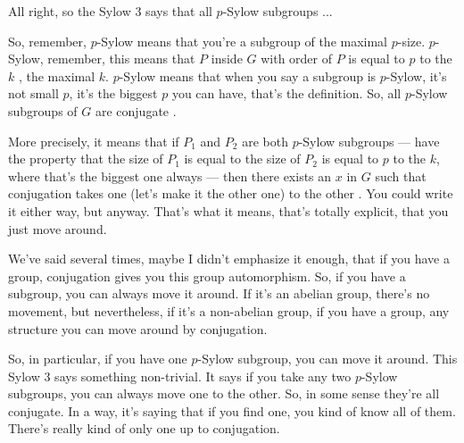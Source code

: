 \begin{speech}[00:35:20 - 00:37:26]
All right, so the Sylow $3$ says that all $p$-Sylow subgroups ...

So, remember, $p$-Sylow means that you're a subgroup of the maximal $p$-size. $p$-Sylow, remember, this means that $P$ inside $G$ with order of $P$ is equal to $p$ to the $k$ , the maximal $k$. $p$-Sylow means that when you say a subgroup is $p$-Sylow, it's not small $p$, it's the biggest $p$ you can have, that's the definition. So, all $p$-Sylow subgroups of $G$ are conjugate .

More precisely, it means that if $P_1$ and $P_2$ are both $p$-Sylow subgroups --- have the property that the size of $P_1$ is equal to the size of $P_2$ is equal to $p$ to the $k$, where that's the biggest one always --- then there exists an $x$ in $G$ such that conjugation takes one (let's make it the other one) to the other . You could write it either way, but anyway. That's what it means, that's totally explicit, that you just move around.

We've said several times, maybe I didn't emphasize it enough, that if you have a group, conjugation gives you this group automorphism. So, if you have a subgroup, you can always move it around. If it's an abelian group, there's no movement, but nevertheless, if it's a non-abelian group, if you have a group, any structure you can move around by conjugation.

So, in particular, if you have one $p$-Sylow subgroup, you can move it around. This Sylow $3$ says something non-trivial. It says if you take any two $p$-Sylow subgroups, you can always move one to the other. So, in some sense they're all conjugate. In a way, it's saying that if you find one, you kind of know all of them. There's really kind of only one up to conjugation.
\end{speech}

